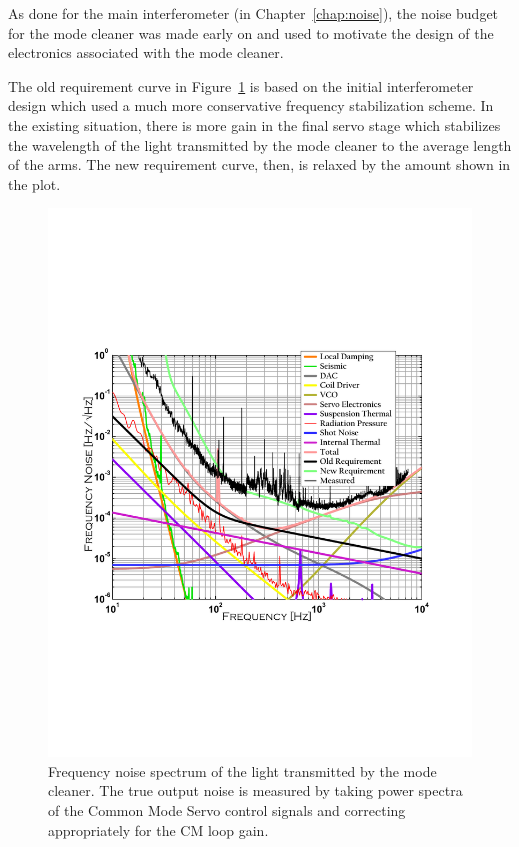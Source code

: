 As done for the main interferometer (in Chapter~\ref{chap:noise}), the noise budget
for the mode cleaner was made early on and used to motivate the design of the
electronics associated with the mode cleaner.

The old requirement curve in Figure~\ref{fig:MCnoise} is based on the initial 
interferometer design which
used a much more conservative frequency stabilization scheme. In the existing
situation, there is more gain in the final servo stage which stabilizes the
wavelength of the light transmitted by the mode cleaner to the average length of
the arms. The new requirement curve, then, is relaxed by the amount shown in the
plot. 

\begin{figure}[!h]
\centerline{\includegraphics[angle=0,width=6.5in]{Figures/AppC/mcn2.pdf}}
\caption[Mode Cleaner Noise Budget]{Frequency noise spectrum of the light
               transmitted by the mode cleaner. The true output noise is measured 
               by taking
               power spectra of the Common Mode Servo control signals and
               correcting appropriately for the CM loop gain.}
\label{fig:MCnoise}
\end{figure}

